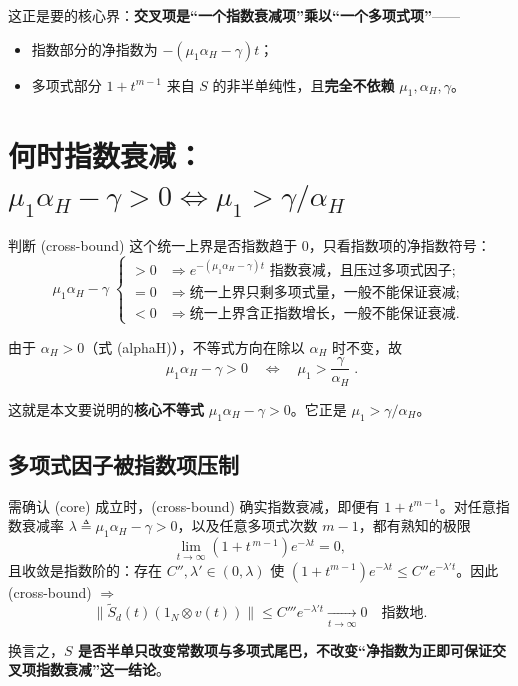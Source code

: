 \documentclass[UTF8]{ctexart}
\begin{document}
这正是要的核心界：\textbf{交叉项是“一个指数衰减项”乘以“一个多项式项”}——
\begin{itemize}
  \item 指数部分的净指数为 $-(\mu_1 \alpha_H - \gamma) t$；
  \item 多项式部分 $1+t^{m-1}$ 来自 $S$ 的非半单纯性，且\textbf{完全不依赖} $\mu_1, \alpha_H, \gamma$。
\end{itemize}

\section{何时指数衰减：$\mu_1 \alpha_H - \gamma > 0 \Longleftrightarrow \mu_1 > \gamma / \alpha_H$}

判断 (cross-bound) 这个统一上界是否指数趋于 $0$，只看指数项的净指数符号：
\[
\mu_1 \alpha_H - \gamma \;\begin{cases}
> 0 & \Rightarrow e^{-(\mu_1\alpha_H-\gamma)t} \text{ 指数衰减，且压过多项式因子}; \\[1mm]
= 0 & \Rightarrow \text{统一上界只剩多项式量，一般不能保证衰减}; \\[1mm]
< 0 & \Rightarrow \text{统一上界含正指数增长，一般不能保证衰减}.
\end{cases}
\]

由于 $\alpha_H > 0$（式 (alphaH)），不等式方向在除以 $\alpha_H$ 时不变，故
\begin{equation}
\boxed{\;\mu_1 \alpha_H - \gamma > 0 \quad \Longleftrightarrow \quad \mu_1 > \frac{\gamma}{\alpha_H}\;}. \tag{core}
\end{equation}

这就是本文要说明的\textbf{核心不等式} $\mu_1 \alpha_H - \gamma > 0$。它正是 $\mu_1 > \gamma / \alpha_H$。

\subsection{多项式因子被指数项压制}

需确认 (core) 成立时，(cross-bound) 确实指数衰减，即便有 $1+t^{m-1}$。对任意指数衰减率 $\lambda \triangleq \mu_1 \alpha_H - \gamma > 0$，以及任意多项式次数 $m-1$，都有熟知的极限
\[
\lim_{t\to\infty} (1+t^{\,m-1}) e^{-\lambda t} = 0,
\]
且收敛是指数阶的：存在 $C'', \lambda' \in (0, \lambda)$ 使 $(1+t^{m-1}) e^{-\lambda t} \leq C'' e^{-\lambda' t}$。因此 (cross-bound) $\Rightarrow$
\[
\|\tilde{S}_d(t)(1_N \otimes v(t))\|
\le C''' e^{-\lambda' t} \xrightarrow[t\to\infty]{} 0
\quad\text{指数地}.
\]

换言之，\textbf{$S$ 是否半单只改变常数项与多项式尾巴，不改变“净指数为正即可保证交叉项指数衰减”这一结论}。
\end{document}

